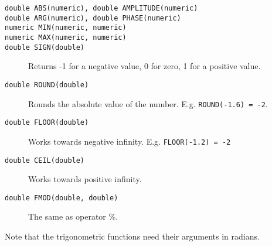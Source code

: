 \begin{description}
  \item[ \texttt{double ABS(numeric),  double AMPLITUDE(numeric)}]
  \item[ \texttt{double ARG(numeric),  double PHASE(numeric)}]
  \item[ \texttt{numeric MIN(numeric, numeric)}]
  \item[ \texttt{numeric MAX(numeric, numeric)}]
  \item[ \texttt{double SIGN(double)}]
       Returns -1 for a negative value, 0 for zero, 1 for a positive value.
  \item[ \texttt{double ROUND(double)}]
       Rounds the absolute value of the number.
       E.g. \texttt{ROUND(-1.6) = -2}.
  \item[ \texttt{double FLOOR(double)}]
       Works towards negative infinity.
       E.g. \texttt{FLOOR(-1.2) = -2}
  \item[ \texttt{double CEIL(double)}] Works towards positive infinity.
  \item[ \texttt{double FMOD(double, double)}] The same as operator \%.
\end{description}
Note that the trigonometric functions need their arguments in radians.

